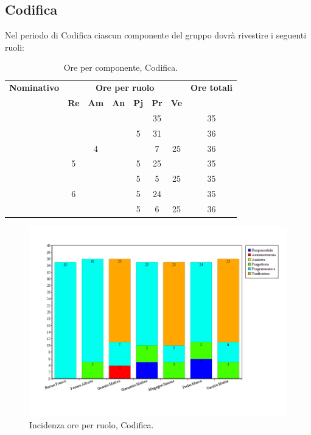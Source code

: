 \subsection{Codifica}
Nel periodo di Codifica ciascun componente del gruppo dovrà rivestire i seguenti ruoli:
\begin{table}[H]
	\begin{center}
		\begin{tabular}{|c|c|c|c|c|c|c|c|}
			\hline
			\textbf{Nominativo} & \multicolumn{6}{c|}{\textbf{Ore per ruolo}} & \textbf{Ore totali} \\
			& \textbf{Re} & \textbf{Am} & \textbf{An} & \textbf{Pj} & \textbf{Pr} & \textbf{Ve} & \\
			\hline
			\FB		&		&		&		&		&	35	&		&	35	\\
			\hline	
			\AF		&		&		&		&	 5	&	31	&		& 	36	\\
			\hline		
			\GN		&		&	4	&		&		&	7	&	25	&	36	\\
			\hline						
			\GR	&	5	&	 	&		&	5	&	25 	& 		&	35	\\
			\hline
			\SM 		&		&		&		&	5	&	5	& 	25	&	35	\\
			\hline
			\MP 		& 	6	&		&		&	5	&	24	&		&	35	\\
			\hline
			\MV 		&		&		&		&	5	&	6	&	25	& 	36	\\
			\hline			
		\end{tabular}
	\end{center}
	\caption{Ore per componente, Codifica.}
\end{table}

\begin{figure}[H]
	\centering
	\includegraphics[scale=0.4]{immagini/Grafi/GrafoCod}
	\caption{Incidenza ore per ruolo, Codifica.}
\end{figure}

